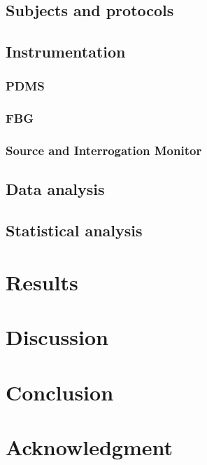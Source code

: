 \documentclass[conference]{IEEEtran}
\begin{document}
	\subsection{Subjects and protocols}
	
	
	\subsection{Instrumentation}
	\cite{dos}
	
	\subsubsection{PDMS}
	
	\subsubsection{FBG}
	
	\subsubsection{Source and Interrogation Monitor}
	
	
	\subsection{Data analysis}
	
	
	\subsection{Statistical analysis}
	
	
	
	
	\section{Results}
	
	
	
	\section{Discussion}
	
	
	
	
	\section{Conclusion}
	
	
	
	
	\section*{Acknowledgment}
	
	

	\printbibliography
	
		
	
\end{document}

